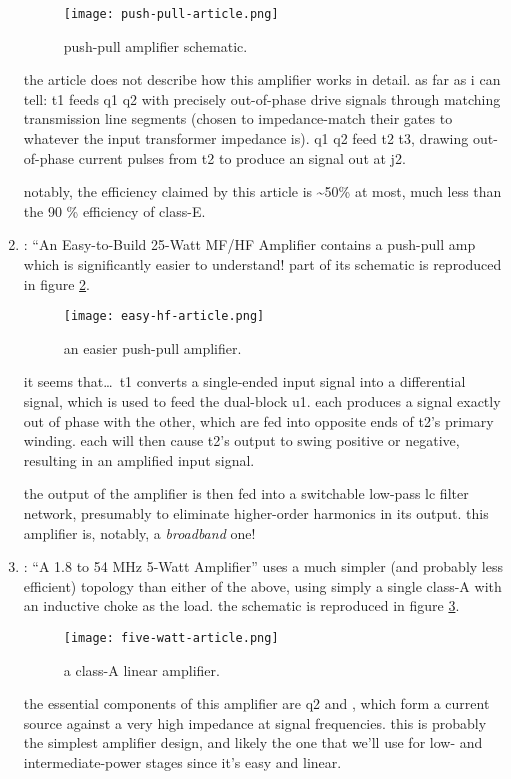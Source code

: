\begin{enumerate}
	\begin{figure}[H]
		\centering
		\texttt{[image: push-pull-article.png]}
		\caption{push-pull amplifier schematic.}
		\label{fig:push-pull-article}
	\end{figure}

	the article does not describe how this amplifier works in detail. as
	far as i can tell: \pr t1 feeds \pr q1 \amp \pr q2 with precisely
	out-of-phase drive signals through matching transmission line segments
	 (chosen to impedance-match their gates to whatever
	the input transformer impedance is). \pr q1 \amp \pr q2 feed \pr t2
	\amp \pr t3, drawing out-of-phase current pulses from \pr t2 to produce
	an \rf signal out at \pr j2.

	notably, the efficiency claimed by this article is \textasciitilde 50\%
	at most, much less than the 90 \% efficiency of class-E.

	\item \autocite[p.~1 dash 2]{rf-amp-classics}: ``An Easy-to-Build
	25-Watt MF/HF Amplifier contains a push-pull amp which is significantly
	easier to understand! part of its schematic is reproduced in figure
	\ref{fig:easy-hf-article}.

	\begin{figure}[H]
		\centering
		\texttt{[image: easy-hf-article.png]}
		\caption{an easier push-pull amplifier.}
		\label{fig:easy-hf-article}
	\end{figure}

	it seems that\ldots\ \pr t1 converts a single-ended input signal into a
	differential signal, which is used to feed the dual-\jfet block \pr u1.
	each \jfet produces a signal exactly out of phase with the other, which
	are fed into opposite ends of \pr t2's primary winding. each \jfet will
	then cause \pr t2's output to swing positive or negative, resulting in
	an amplified input signal.

	the output of the amplifier is then fed into a switchable low-pass lc
	filter network, presumably to eliminate higher-order harmonics in its
	output. this amplifier is, notably, a \emph{broadband} one!

	\item \autocite[p.~1 dash 19]{rf-amp-classics}: ``A 1.8 to 54 MHz
	5-Watt Amplifier'' uses a much simpler (and probably less efficient)
	topology than either of the above, using simply a single \mosfet
	class-A with an inductive choke as the load. the schematic is
	reproduced in figure \ref{fig:five-watt-article}.

	\begin{figure}[H]
		\centering
		\texttt{[image: five-watt-article.png]}
		\caption{a class-A linear amplifier.}
		\label{fig:five-watt-article}
	\end{figure}

	the essential components of this amplifier are \pr q2 and ,
	which form a current source against a very high impedance at signal
	frequencies. this is probably the simplest \rf amplifier design, and
	likely the one that we'll use for low- and intermediate-power stages
	since it's easy and linear.
\end{enumerate}

